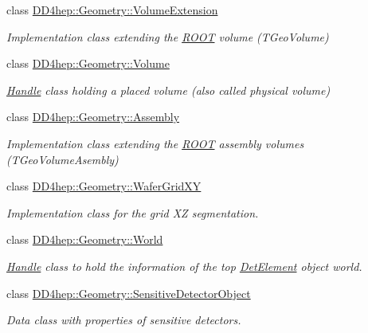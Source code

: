 \begin{DoxyCompactItemize}
class \hyperlink{class_d_d4hep_1_1_geometry_1_1_volume_extension}{D\+D4hep\+::\+Geometry\+::\+Volume\+Extension}
\begin{DoxyCompactList}\small\item\em Implementation class extending the \hyperlink{namespace_r_o_o_t}{R\+O\+OT} volume (T\+Geo\+Volume) \end{DoxyCompactList}\item 
class \hyperlink{class_d_d4hep_1_1_geometry_1_1_volume}{D\+D4hep\+::\+Geometry\+::\+Volume}
\begin{DoxyCompactList}\small\item\em \hyperlink{class_d_d4hep_1_1_handle}{Handle} class holding a placed volume (also called physical volume) \end{DoxyCompactList}\item 
class \hyperlink{class_d_d4hep_1_1_geometry_1_1_assembly}{D\+D4hep\+::\+Geometry\+::\+Assembly}
\begin{DoxyCompactList}\small\item\em Implementation class extending the \hyperlink{namespace_r_o_o_t}{R\+O\+OT} assembly volumes (T\+Geo\+Volume\+Asembly) \end{DoxyCompactList}\item 
class \hyperlink{class_d_d4hep_1_1_geometry_1_1_wafer_grid_x_y}{D\+D4hep\+::\+Geometry\+::\+Wafer\+Grid\+XY}
\begin{DoxyCompactList}\small\item\em Implementation class for the grid XZ segmentation. \end{DoxyCompactList}\item 
class \hyperlink{class_d_d4hep_1_1_geometry_1_1_world}{D\+D4hep\+::\+Geometry\+::\+World}
\begin{DoxyCompactList}\small\item\em \hyperlink{class_d_d4hep_1_1_handle}{Handle} class to hold the information of the top \hyperlink{class_d_d4hep_1_1_geometry_1_1_det_element}{Det\+Element} object \textquotesingle{}world\textquotesingle{}. \end{DoxyCompactList}\item 
class \hyperlink{class_d_d4hep_1_1_geometry_1_1_sensitive_detector_object}{D\+D4hep\+::\+Geometry\+::\+Sensitive\+Detector\+Object}
\begin{DoxyCompactList}\small\item\em Data class with properties of sensitive detectors. \end{DoxyCompactList}\item 

\end{DoxyCompactItemize}
